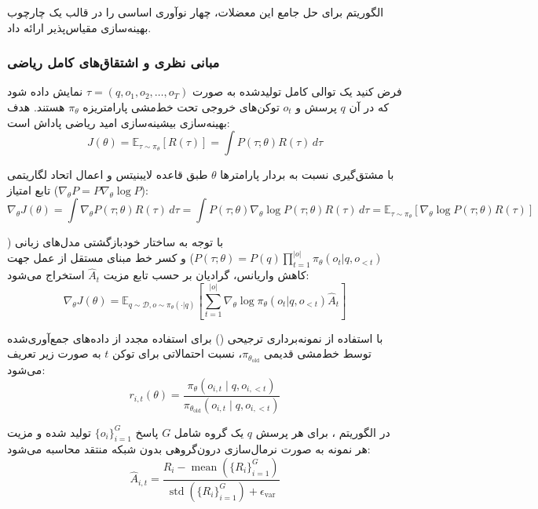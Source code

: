الگوریتم  برای حل جامع این معضلات، چهار نوآوری اساسی را در قالب یک چارچوب بهینه‌سازی مقیاس‌پذیر ارائه داد.

\subsubsection*{مبانی نظری و اشتقاق‌های کامل ریاضی}

فرض کنید یک توالی کامل تولیدشده به صورت $\tau = (q, o_1, o_2, \dots, o_T)$ نمایش داده شود که در آن $q$ پرسش و $o_t$ توکن‌های خروجی تحت خط‌مشی پارامتریزه $\pi_\theta$ هستند. هدف بهینه‌سازی بیشینه‌سازی امید ریاضی پاداش است:
\begin{equation}
	J(\theta) = \mathbb{E}_{\tau \sim \pi_\theta}[R(\tau)] = \int P(\tau; \theta) R(\tau) \, d\tau
\end{equation}

با مشتق‌گیری نسبت به بردار پارامترها $\theta$ طبق قاعده لایبنیتس و اعمال اتحاد لگاریتمی تابع امتیاز ($\nabla_\theta P = P \nabla_\theta \log P$):
\begin{equation}
	\nabla_\theta J(\theta) = \int \nabla_\theta P(\tau; \theta) R(\tau) \, d\tau = \int P(\tau; \theta) \nabla_\theta \log P(\tau; \theta) R(\tau) \, d\tau = \mathbb{E}_{\tau \sim \pi_\theta} \left[ \nabla_\theta \log P(\tau; \theta) R(\tau) \right]
\end{equation}

با توجه به ساختار خودبازگشتی مدل‌های زبانی ($P(\tau; \theta) = P(q) \prod_{t=1}^{|o|} \pi_\theta(o_t | q, o_{<t})$) و کسر خط مبنای مستقل از عمل جهت کاهش واریانس، گرادیان بر حسب تابع مزیت $\hat{A}_t$ استخراج می‌شود:
\begin{equation}
	\nabla_\theta J(\theta) = \mathbb{E}_{q \sim \mathcal{D}, o \sim \pi_\theta(\cdot|q)} \left[ \sum_{t=1}^{|o|} \nabla_\theta \log \pi_\theta(o_t | q, o_{<t}) \hat{A}_t \right]
\end{equation}

با استفاده از نمونه‌برداری ترجیحی () برای استفاده مجدد از داده‌های جمع‌آوری‌شده توسط خط‌مشی قدیمی $\pi_{\theta_{\text{old}}}$، نسبت احتمالاتی برای توکن $t$ به صورت زیر تعریف می‌شود:
\begin{equation}
	r_{i,t}(\theta) = \frac{\pi_\theta(o_{i,t} \mid q, o_{i,<t})}{\pi_{\theta_{\text{old}}}(o_{i,t} \mid q, o_{i,<t})}
\end{equation}

در الگوریتم  \cite{shao2024deepseekmath}، برای هر پرسش $q$ یک گروه شامل $G$ پاسخ $\{o_i\}_{i=1}^G$ تولید شده و مزیت هر نمونه به صورت نرمال‌سازی درون‌گروهی بدون شبکه منتقد محاسبه می‌شود:
\begin{equation}
	\hat{A}_{i,t} = \frac{R_i - \operatorname{mean}(\{R_i\}_{i=1}^G)}{\operatorname{std}(\{R_i\}_{i=1}^G) + \epsilon_{\text{var}}}
\end{equation}


